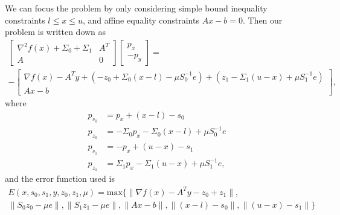 \documentclass{article}
\begin{document}
We can focus the problem by only considering 
    simple bound inequality constraints $l \le x \le u$, and
    affine equality constraints $A x - b = 0$.
Then our problem is written down as
\begin{multline}
\begin{bmatrix}
    \nabla^2 f(x) + \Sigma_0 + \Sigma_1 & A^T \\
    A & 0 
\end{bmatrix}
\begin{bmatrix} p_x \\ -p_y \end{bmatrix}
    = \\ -
\begin{bmatrix}
    \nabla f(x) - A^T y + (-z_0 + \Sigma_0 (x - l) - \mu S_0^{-1} e) 
                        + (z_1 - \Sigma_1 (u - x) + \mu S_1^{-1} e) \\
    A x - b
\end{bmatrix},
\end{multline}
where
\begin{align}
    p_{s_0} &= p_x + (x - l) - s_0 \\
    p_{z_0} &= -\Sigma_0 p_x - \Sigma_0 (x - l) + \mu S_0^{-1} e \\
    p_{s_1} &= -p_x + (u - x) - s_1 \\
    p_{z_1} &= \Sigma_1 p_x - \Sigma_1 (u - x) + \mu S_1^{-1} e,
\end{align}
and the error function used is
\begin{multline}
E(x, s_0, s_1, y, z_0, z_1, \mu) = \text{max}\{ 
    \| \nabla f(x) - A^T y - z_0 + z_1 \|, \\
    \| S_0 z_0 - \mu e \|, 
    \| S_1 z_1 - \mu e \|, 
    \| A x - b \|, 
    \|(x - l) - s_0 \|, 
    \|(u - x) - s_1 \| \}
\end{multline}
\end{document}
